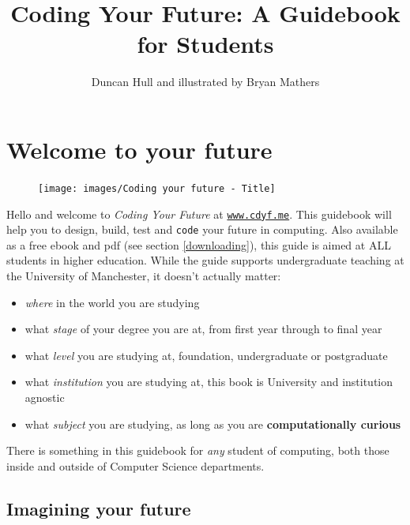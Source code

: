 \documentclass[
]{book}
\title{Coding Your Future: A Guidebook for Students}
\author{Duncan Hull and illustrated by Bryan Mathers}
\date{}
\providecommand{\tightlist}{%
  \setlength{\itemsep}{0pt}\setlength{\parskip}{0pt}}
\begin{document}
\maketitle

{
\setcounter{tocdepth}{1}
\tableofcontents
}
\hypertarget{welcome}{%
\chapter*{Welcome to your future}\label{welcome}}

\begin{figure}

{\centering \texttt{[image: images/Coding your future - Title]} 

}

\end{figure}

Hello and welcome to \emph{Coding Your Future} at \href{https://www.cdyf.me}{\texttt{www.cdyf.me}}. This guidebook will help you to design, build, test and \texttt{code} your future in computing. Also available as a free ebook and pdf (see section \ref{downloading}), this guide is aimed at ALL students in higher education. While the guide supports undergraduate teaching at the University of Manchester, it doesn't actually matter:

\begin{itemize}
\tightlist
\item
  \emph{where} in the world you are studying
\item
  what \emph{stage} of your degree you are at, from first year through to final year
\item
  what \emph{level} you are studying at, foundation, undergraduate or postgraduate
\item
  what \emph{institution} you are studying at, this book is University and institution agnostic
\item
  what \emph{subject} you are studying, as long as you are \textbf{computationally curious}
\end{itemize}

There is something in this guidebook for \emph{any} student of computing, both those inside and outside of Computer Science departments. 👨🏿‍💻👨‍💻👩🏽‍💻👩‍💻👩🏿‍💻

\hypertarget{picturethis}{%
\section{Imagining your future}\label{picturethis}}
\end{document}
